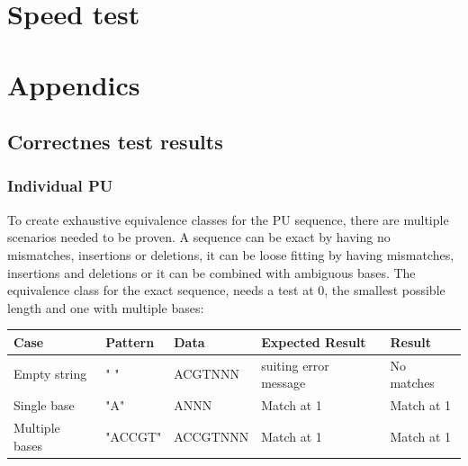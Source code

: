 \documentclass[12pt]{article}
\newcommand{\pu}{PU }
\begin{document}
\section{Speed test}

\newpage
\printbibliography









\section{Appendics}


\subsection{Correctnes test results}


\subsubsection{Individual \pu}


To create exhaustive equivalence classes for the \pu sequence, there are multiple scenarios needed to be proven.
A sequence can be exact by having no mismatches, insertions or deletions, it can be loose fitting by having 
mismatches, insertions and deletions or it can be combined with ambiguous bases.
The equivalence class for the exact sequence, needs a test at 0, the smallest possible length and one with multiple
bases:
\begin{table}[H]
\begin{tabular}{p{4cm}|p{3.6cm}|p{2.5cm}|p{2.2cm}|p{2.2cm}}
Case 			& Pattern & Data & Expected Result & Result \\ \hline
Empty string		& " " & ACGTNNN & suiting error message & No matches \\ \hline
Single base 		& "A" & ANNN & Match at 1 & Match at 1\\ \hline
Multiple bases	& "ACCGT" & ACCGTNNN & Match at 1 & Match at 1 \\ \hline
\end{tabular}
\end{table}
\end{document}
